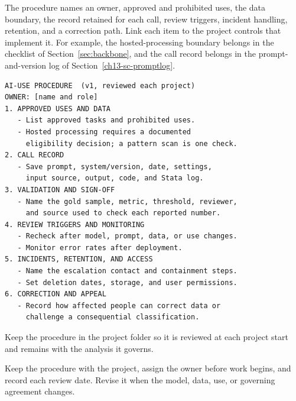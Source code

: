 \documentclass[
    a4paper,
    fontsize=10pt,
    twoside=true,
    numbers=noenddot,
]{kaobook}
\begin{document}
The procedure names an owner, approved and prohibited uses, the data boundary, the record retained for each call, review triggers, incident handling, retention, and a correction path. Link each item to the project controls that implement it. For example, the hosted-processing boundary belongs in the checklist of Section~\ref{sec:backbone}, and the call record belongs in the prompt-and-version log of Section~\ref{ch13-sc-promptlog}.

\begin{kaobox}[frametitle={A one-page AI-use procedure for a two-person shop}]
\par
{\footnotesize
\begin{verbatim}
AI-USE PROCEDURE  (v1, reviewed each project)
OWNER: [name and role]
1. APPROVED USES AND DATA
   - List approved tasks and prohibited uses.
   - Hosted processing requires a documented
     eligibility decision; a pattern scan is one check.
2. CALL RECORD
   - Save prompt, system/version, date, settings,
     input source, output, code, and Stata log.
3. VALIDATION AND SIGN-OFF
   - Name the gold sample, metric, threshold, reviewer,
     and source used to check each reported number.
4. REVIEW TRIGGERS AND MONITORING
   - Recheck after model, prompt, data, or use changes.
   - Monitor error rates after deployment.
5. INCIDENTS, RETENTION, AND ACCESS
   - Name the escalation contact and containment steps.
   - Set deletion dates, storage, and user permissions.
6. CORRECTION AND APPEAL
   - Record how affected people can correct data or
     challenge a consequential classification.
\end{verbatim}
}
Keep the procedure in the project folder so it is reviewed at each project start and remains with the analysis it governs.
\end{kaobox}

Keep the procedure with the project, assign the owner before work begins, and record each review date. Revise it when the model, data, use, or governing agreement changes.
\end{document}
